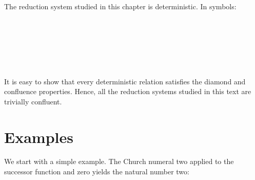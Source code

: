 The reduction system studied in this chapter is deterministic. In
symbols:

\begin{fence}
\begin{code}%
\>[0]\<%
\\
\>[0][@{}l@{\AgdaIndent{0}}]%
\>[2]\AgdaSpace{}%
\AgdaSymbol{:}\AgdaSpace{}%
\AgdaSpace{}%
\AgdaSymbol{\{}\AgdaSpace{}%
\AgdaSpace{}%
\AgdaSymbol{\}}\<%
\\
\>[2][@{}l@{\AgdaIndent{0}}]%
\>[4]\AgdaSpace{}%
\AgdaSpace{}%
\AgdaSpace{}%
\<%
\\
%
\>[4]%
\>[893I]\AgdaSpace{}%
\AgdaSpace{}%
\<%
\\
\>[.][@{}l@{}]\<[893I]%
\>[6]\AgdaComment{------}\<%
\\
%
\>[4]\AgdaSpace{}%
\AgdaSpace{}%
\AgdaSpace{}%
\<%
\end{code}
\end{fence}

It is easy to show that every deterministic relation satisfies the
diamond and confluence properties. Hence, all the reduction systems
studied in this text are trivially confluent.

\hypertarget{examples-1}{%
\section{Examples}\label{examples-1}}

We start with a simple example. The Church numeral two applied to the
successor function and zero yields the natural number two:

